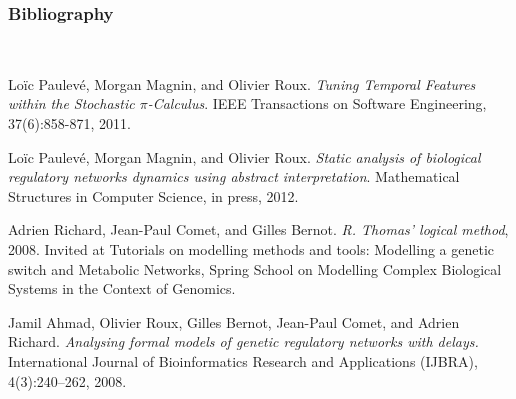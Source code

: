 
\begin{frame}[c]
  \frametitle{Bibliography}

\footnotesize
\setlength{\parindent}{-1em}
\setlength{\parskip}{0.5em}
~

\vfill

 Loïc Paulevé, Morgan Magnin, and Olivier Roux. \textit{Tuning Temporal Features within the Stochastic $\pi$-Calculus}. IEEE Transactions on Software Engineering, 37(6):858-871, 2011.


 Loïc Paulevé, Morgan Magnin, and Olivier Roux. \textit{Static analysis of biological regulatory networks dynamics using abstract interpretation}. Mathematical Structures in Computer Science, in press, 2012.


 Adrien Richard, Jean-Paul Comet, and Gilles Bernot. \textit{R. Thomas' logical method}, 2008. Invited at Tutorials on modelling methods and tools: Modelling a genetic switch and Metabolic Networks, Spring School on Modelling Complex Biological Systems in the Context of Genomics.





Jamil Ahmad, Olivier Roux, Gilles Bernot, Jean-Paul Comet, and Adrien Richard.
\textit{Analysing formal models of genetic regulatory networks with delays.}
 International Journal of Bioinformatics Research and
  Applications (IJBRA), 4(3):240--262, 2008.


\end{frame}
